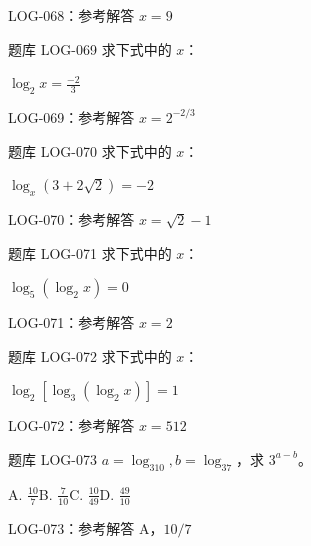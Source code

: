 \documentclass[aspectratio=169,10pt]{beamer}
\begin{document}
\ifdefined\TeacherEdition
\begin{frame}[t]{LOG-068：参考解答}
$x=9$
\end{frame}
\fi

\begin{campuspractice}{题库 LOG-069}
求下式中的 $x$：\par
$\log_2x=\frac{-2}{3}$
\end{campuspractice}

\ifdefined\TeacherEdition
\begin{frame}[t]{LOG-069：参考解答}
$x=2^{-2/3}$
\end{frame}
\fi

\begin{campuspractice}{题库 LOG-070}
求下式中的 $x$：\par
$\log_x(3+2\sqrt2)=-2$
\end{campuspractice}

\ifdefined\TeacherEdition
\begin{frame}[t]{LOG-070：参考解答}
$x=\sqrt2-1$
\end{frame}
\fi

\begin{campuspractice}{题库 LOG-071}
求下式中的 $x$：\par
$\log_5(\log_2x)=0$
\end{campuspractice}

\ifdefined\TeacherEdition
\begin{frame}[t]{LOG-071：参考解答}
$x=2$
\end{frame}
\fi

\begin{campuspractice}{题库 LOG-072}
求下式中的 $x$：\par
$\log_2[\log_3(\log_2x)]=1$
\end{campuspractice}

\ifdefined\TeacherEdition
\begin{frame}[t]{LOG-072：参考解答}
$x=512$
\end{frame}
\fi

\begin{campuspractice}{题库 LOG-073}
$a=\log_310,b=\log_37$，求 $3^{a-b}$。\par A. $\frac{10}{7}$\quad B. $\frac{7}{10}$\quad C. $\frac{10}{49}$\quad D. $\frac{49}{10}$
\end{campuspractice}

\ifdefined\TeacherEdition
\begin{frame}[t]{LOG-073：参考解答}
A，$10/7$
\end{frame}
\fi
\end{document}
